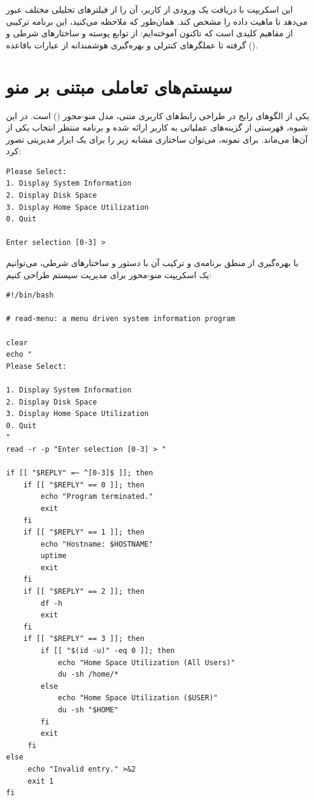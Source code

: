 این اسکریپت با دریافت یک ورودی از کاربر، آن را از فیلترهای تحلیلی مختلف عبور می‌دهد تا ماهیت داده را مشخص کند. همان‌طور که ملاحظه می‌کنید، این برنامه ترکیبی از مفاهیم کلیدی است که تاکنون آموخته‌ایم: از توابع پوسته و ساختارهای شرطی \cmd{[[ ]]} و \cmd{(( ))} گرفته تا عملگرهای کنترلی \cmd{\&\&} و بهره‌گیری هوشمندانه از عبارات باقاعده ().

\section{سیستم‌های تعاملی مبتنی بر منو}

یکی از الگوهای رایج در طراحی رابط‌های کاربری متنی، مدل منو-محور () است. در این شیوه، فهرستی از گزینه‌های عملیاتی به کاربر ارائه شده و برنامه منتظر انتخاب یکی از آن‌ها می‌ماند. برای نمونه، می‌توان ساختاری مشابه زیر را برای یک ابزار مدیریتی تصور کرد:

\begin{latin}
\begin{lstlisting}
Please Select:
1. Display System Information
2. Display Disk Space
3. Display Home Space Utilization
0. Quit

Enter selection [0-3] >
\end{lstlisting}
\end{latin}

با بهره‌گیری از منطق برنامه‌ی  و ترکیب آن با دستور  و ساختارهای شرطی، می‌توانیم یک اسکریپت منو-محور برای مدیریت سیستم طراحی کنیم:

\begin{latin}
\begin{lstlisting}
#!/bin/bash

# read-menu: a menu driven system information program

clear
echo "
Please Select:

1. Display System Information
2. Display Disk Space
3. Display Home Space Utilization
0. Quit
"
read -r -p "Enter selection [0-3] > "

if [[ "$REPLY" =~ ^[0-3]$ ]]; then
    if [[ "$REPLY" == 0 ]]; then
        echo "Program terminated."
        exit
    fi
    if [[ "$REPLY" == 1 ]]; then
        echo "Hostname: $HOSTNAME"
        uptime
        exit
    fi
    if [[ "$REPLY" == 2 ]]; then
        df -h
        exit
    fi
    if [[ "$REPLY" == 3 ]]; then
        if [[ "$(id -u)" -eq 0 ]]; then
            echo "Home Space Utilization (All Users)"
            du -sh /home/*
        else
            echo "Home Space Utilization ($USER)"
            du -sh "$HOME"
        fi
        exit
     fi
else
     echo "Invalid entry." >&2
     exit 1
fi
\end{lstlisting}
\end{latin}

